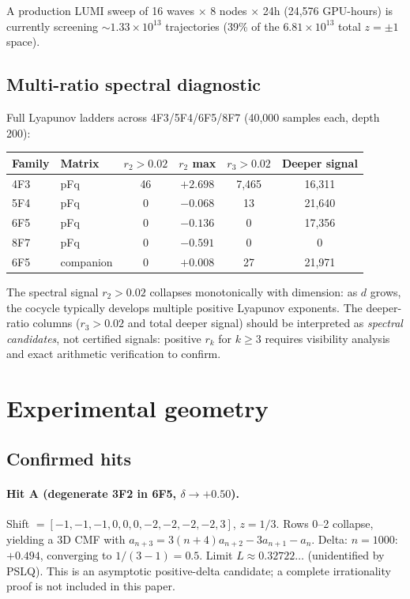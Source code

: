 \documentclass[11pt]{article}
\begin{document}
A production LUMI sweep of 16 waves $\times$ 8 nodes $\times$ 24h (24{,}576 GPU-hours) is currently screening $\sim 1.33 \times 10^{13}$ trajectories (39\% of the $6.81 \times 10^{13}$ total $z = \pm 1$ space).

\subsection{Multi-ratio spectral diagnostic}

Full Lyapunov ladders across 4F3/5F4/6F5/8F7 (40{,}000 samples each, depth 200):

\begin{center}
\begin{tabular}{llcccc}
\toprule
Family & Matrix & $r_2 > 0.02$ & $r_2$ max & $r_3 > 0.02$ & Deeper signal \\
\midrule
4F3 & pFq & 46 & $+2.698$ & 7{,}465 & 16{,}311 \\
5F4 & pFq & 0 & $-0.068$ & 13 & 21{,}640 \\
6F5 & pFq & 0 & $-0.136$ & 0 & 17{,}356 \\
8F7 & pFq & 0 & $-0.591$ & 0 & 0 \\
6F5 & companion & 0 & $+0.008$ & 27 & 21{,}971 \\
\bottomrule
\end{tabular}
\end{center}

The spectral signal $r_2 > 0.02$ collapses monotonically with dimension: as $d$ grows, the cocycle typically develops multiple positive Lyapunov exponents. The deeper-ratio columns ($r_3 > 0.02$ and total deeper signal) should be interpreted as \emph{spectral candidates}, not certified signals: positive $r_k$ for $k \geq 3$ requires visibility analysis and exact arithmetic verification to confirm.

\section{Experimental geometry}

\subsection{Confirmed hits}

\paragraph{Hit A (degenerate 3F2 in 6F5, $\delta \to +0.50$).}
Shift $= [-1,-1,-1,0,0,0,-2,-2,-2,-2,3]$, $z=1/3$. Rows 0--2 collapse, yielding a 3D CMF with $a_{n+3} = 3(n{+}4)a_{n+2} - 3a_{n+1} - a_n$. Delta: $n=1000$: $+0.494$, converging to $1/(3{-}1) = 0.5$. Limit $L \approx 0.32722\ldots$ (unidentified by PSLQ). This is an asymptotic positive-delta candidate; a complete irrationality proof is not included in this paper.
\end{document}
